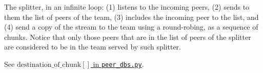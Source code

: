 
The splitter, in an infinite loop: (1) listens to the incoming peers,
(2) sends to them the list of peers of the team, (3) includes the
incoming peer to the list, and (4) send a copy of the stream to the
team using a round-robing, as a sequence of chunks. Notice that only
those peers that are in the list of peers of the splitter are
considered to be in the team served by such splitter.

\begin{comment}
\begin{figure*}
  \fig{1000}{10cm}{joining} \caption{Code related to team
    joining.\label{fig:joining}}
\end{figure*}

The new pseudo-code related to joining a team is describen in the
Fig.~\ref{fig:joining}.
\end{comment}

\begin{notex}
  See \href{https://github.com/P2PSP/simulator/blob/f0c73be1817e7d3b816cc61cd2c8e59b17f9a0e6/src/core/splitter_dbs.py#L296}{$\text{destination\_of\_chunk}[]$ in \texttt{peer\_dbs.py}}.
\end{notex}

